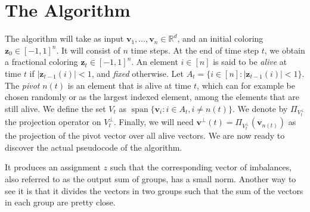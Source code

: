 \documentclass[12pt]{article}
\DeclareMathOperator{\Span}{span}
\begin{document}
\section{The Algorithm}
The algorithm will take as input $\textbf{v}_1,\ldots,\textbf{v}_n\in\mathbb{R}^d$, and an initial coloring $\textbf{z}_0\in[-1,1]^n$. It will consist of $n$ time steps. At the end of time step $t$, we obtain a fractional coloring $\textbf{z}_t\in[-1,1]^n$. An element $i \in [n]$ is said to be \textit{alive} at time $t$ if $|\textbf{z}_{t-1}(i)|<1$, and \textit{fixed} otherwise. Let $A_t=\{i\in[n]:|\textbf{z}_{t-1}(i)|<1\}$. The \textit{pivot} $n(t)$ is an element that is alive at time $t$, which can for example be chosen randomly or as the largest indexed element, among the elements that are still alive. We define the set $V_t$ as $\Span\{\textbf{v}_i:i\in A_t,i\not=n(t)\}$. We denote by $\Pi_{V_t^\perp}$ the projection operator on $V_t^\perp$. Finally, we will need $\textbf{v}^{\perp}(t)=\Pi_{V_t^\perp}(\textbf{v}_{n(t)})$ as the projection of the pivot vector over all alive vectors. We are now ready to discover the actual pseudocode of the algorithm.

It produces an assignment $z$ such that the corresponding vector of imbalances, also referred to as the output sum of groups, has a small norm. Another way to see it is that it divides the vectors in two groups such that the sum of the vectors in each group are pretty close.
\end{document}
